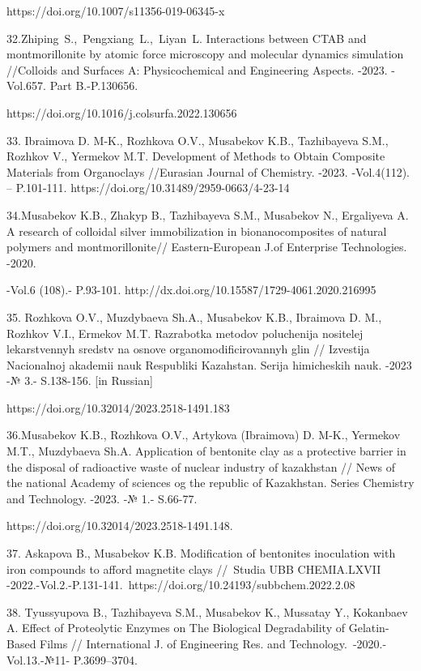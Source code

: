https://doi.org/10.1007/s11356-019-06345-x

32.Zhiping~S.,~Pengxiang~L.,~Liyan~L. Interactions between CTAB and
montmorillonite by atomic force microscopy and molecular dynamics
simulation //Colloids and Surfaces A: Physicochemical and Engineering
Aspects. -2023. -Vol.657. Part B.-P.130656.

https://doi.org/10.1016/j.colsurfa.2022.130656

33. Ibraimova D. M-K., Rozhkova O.V., Musabekov K.B., Tazhibayeva S.M.,
Rozhkov V., Yermekov M.T. Development of Methods to Obtain Composite
Materials from Organoclays //Eurasian Journal of Chemistry. -2023.
-Vol.4(112). -- P.101-111. https://doi.org/10.31489/2959-0663/4-23-14

34.Musabekov K.B., Zhakyp B., Tazhibayeva S.M., Musabekov N., Ergaliyeva
A. A research of colloidal silver immobilization in bionanocomposites of
natural polymers and montmorillonite// Eastern-European J.of Enterprise
Technologies. -2020.

-Vol.6 (108).- P.93-101.
http://dx.doi.org/10.15587/1729-4061.2020.216995

35. Rozhkova O.V., Muzdybaeva Sh.A., Musabekov K.B., Ibraimova D. M.,
Rozhkov V.I., Ermekov M.T. Razrabotka metodov poluchenija nositelej
lekarstvennyh sredstv na osnove organomodificirovannyh glin // Izvestija
Nacional\textquotesingle noj akademii nauk Respubliki Kazahstan. Serija
himicheskih nauk. -2023 -№ 3.- S.138-156. {[}in Russian{]}

https://doi.org/10.32014/2023.2518-1491.183

36.Musabekov K.B., Rozhkova O.V., Artykova (Ibraimova) D. M-K., Yermekov
M.T., Muzdybaeva Sh.A. Application of bentonite clay as a protective
barrier in the disposal of radioactive waste of nuclear industry of
kazakhstan // News of the national Academy of sciences og the republic
of Kazakhstan. Series Chemistry and Technology. -2023. -№ 1.- S.66-77.

https://doi.org/10.32014/2023.2518-1491.148.

37. Askapova B., Musabekov K.B. Modification of bentonites inoculation
with iron compounds to afford magnetite clays //~Studia UBB CHEMIA.LXVII
-2022.-Vol.2.-P.131-141.~https://doi.org/10.24193/subbchem.2022.2.08

38. Tyussyupova B., Tazhibayeva S.M., Musabekov K., Mussatay Y.,
Kokanbaev A. Effect of Proteolytic Enzymes on The Biological
Degradability of Gelatin-Based Films // International J. of Engineering
Res. and Technology.~-2020.-Vol.13.-№11- P.3699--3704.

